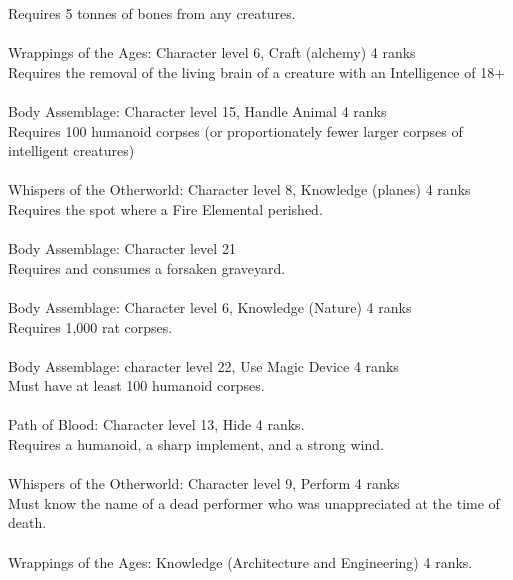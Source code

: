 \begin{multicols}{2}
\begin{small}
Requires 5 tonnes of bones from any creatures.\\
\\
Wrappings of the Ages: Character level 6, Craft (alchemy) 4 ranks\\
Requires the removal of the living brain of a creature with an Intelligence of 18+\\
\\
Body Assemblage: Character level 15, Handle Animal 4 ranks\\
Requires 100 humanoid corpses (or proportionately fewer larger corpses of intelligent creatures)\\
\\
Whispers of the Otherworld: Character level 8, Knowledge (planes) 4 ranks\\
Requires the spot where a Fire Elemental perished.\\
\\
Body Assemblage: Character level 21\\
Requires and consumes a forsaken graveyard.\\
\\
Body Assemblage: Character level 6, Knowledge (Nature) 4 ranks\\
Requires 1,000 rat corpses.\\
\\
Body Assemblage: character level 22, Use Magic Device 4 ranks\\
Must have at least 100 humanoid corpses.\\
\\
Path of Blood: Character level 13, Hide 4 ranks.\\
Requires a humanoid, a sharp implement, and a strong wind.\\
\\
Whispers of the Otherworld: Character level 9, Perform 4 ranks\\
Must know the name of a dead performer who was unappreciated at the time of death.\\
\\
Wrappings of the Ages: Knowledge (Architecture and Engineering) 4 ranks.\\

\end{small}
\end{multicols}
